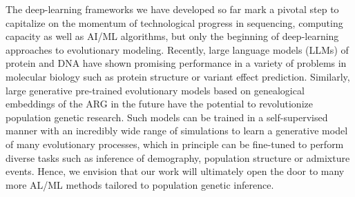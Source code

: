 The deep-learning frameworks we have developed so far mark a pivotal step to capitalize on the momentum of technological progress in sequencing, computing capacity as well as AI/ML algorithms, but only the beginning of deep-learning approaches to evolutionary modeling. Recently, large language models (LLMs) of protein and DNA have shown promising performance in a variety of problems in molecular biology such as protein structure or variant effect prediction. Similarly, large generative pre-trained evolutionary models based on genealogical embeddings of the ARG in the future have the potential to revolutionize population genetic research. Such models can be trained in a self-supervised manner with an incredibly wide range of simulations to learn a generative model of many evolutionary processes, which in principle can be fine-tuned to perform diverse tasks such as inference of demography, population structure or admixture events. Hence, we envision that our work will ultimately open the door to many more AL/ML methods tailored to population genetic inference.
